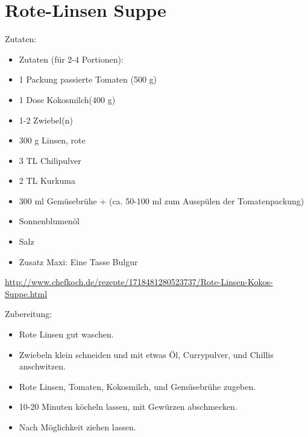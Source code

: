 \section{Rote-Linsen Suppe}
Zutaten:
\begin{itemize}
	\item Zutaten (für 2-4 Portionen):
	\item 1 Packung passierte Tomaten (500 g)
	\item 1 Dose Kokosmilch(400 g)
	\item 1-2 Zwiebel(n)
	\item 300 g	Linsen, rote
	\item 3 TL	Chilipulver
	\item 2 TL	Kurkuma
	\item 300 ml Gemüsebrühe + (ca. 50-100 ml zum Ausspülen der Tomatenpackung)
	\item Sonnenblumenöl
	\item Salz
	\item Zusatz Maxi: Eine Tasse Bulgur
\end{itemize}

\url{http://www.chefkoch.de/rezepte/1718481280523737/Rote-Linsen-Kokos-Suppe.html}

\noindent Zubereitung:

\begin{itemize}
	\item Rote Linsen gut waschen.
	\item Zwiebeln klein schneiden und mit etwas Öl, Currypulver, und Chillis
		anschwitzen.
	\item Rote Linsen, Tomaten, Kokosmilch, und Gemüsebrühe zugeben.
	\item 10-20 Minuten köcheln lassen, mit Gewürzen abschmecken.
	\item Nach Möglichkeit ziehen lassen.
\end{itemize}

\noindent
\mbox{}
\vfill
\begin{center}
\end{center}
\vfill
\mbox{ }
\newpage
